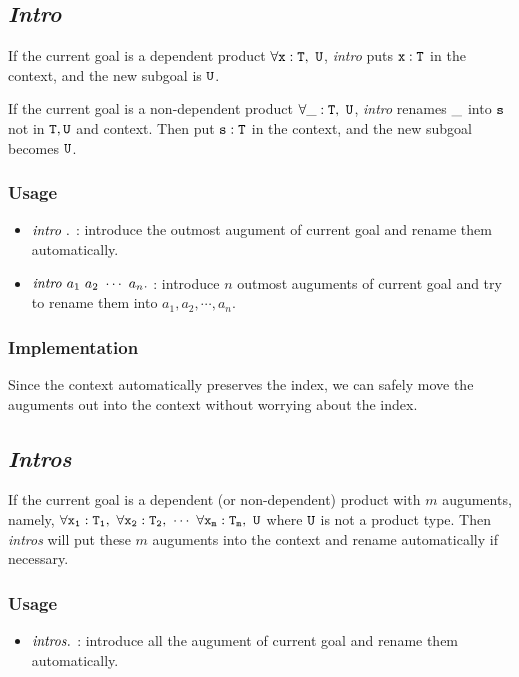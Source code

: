 \subsection{\it Intro}

If the current goal is a dependent product $\tt \forall x:T,\ U$, \textit{intro} puts 
$\tt x:T$ in the context, and the new subgoal is $\tt U$.\par
If the current goal is a non-dependent product $\tt \forall \_:T,\ U$, \textit{intro} renames
$\tt \_$ into $\tt s$ not in $\tt T,U$ and context. Then put $\tt s:T$ in the context, 
and the new subgoal becomes $\tt U$.

\subsubsection*{Usage}
\begin{itemize}
\item ${\it intro}\ .$ : introduce the outmost augument of current goal and rename them automatically.
\item ${\it intro}\ a_1\ a_2\ \cdots\ a_n.$ : introduce $n$ outmost auguments of current goal and
try to rename them into $a_1,a_2,\cdots,a_n$.
\end{itemize}

\subsubsection*{Implementation}
Since the context automatically preserves the index, we
can safely move the auguments out into the context without worrying about the index.

\subsection{\it Intros}

If the current goal is a dependent (or non-dependent) product with $m$ auguments, namely,
$\tt \forall x_1:T_1,\ \forall x_2:T_2,\ \cdots\ \forall x_m:T_m,\ U$ where $\tt U$ is not a product type.
Then \textit{intros} will put these $m$ auguments into the context and rename automatically if necessary.

\subsubsection*{Usage}
\begin{itemize}
\item ${\it intros}.$ : introduce all the augument of current goal and rename them automatically.
\end{itemize}

